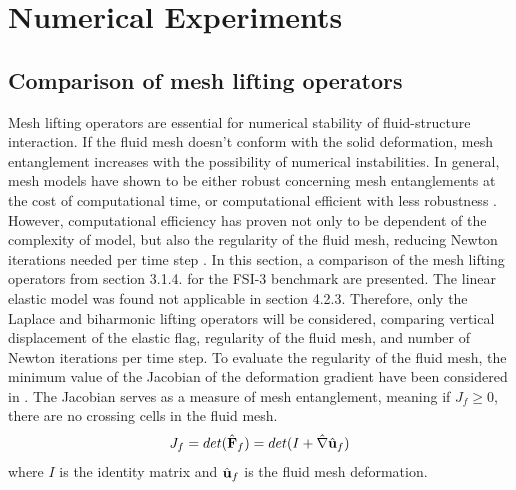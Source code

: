  \chapter{Numerical Experiments}
\section{Comparison of mesh lifting operators}
Mesh lifting operators are essential for numerical stability of fluid-structure interaction. If the fluid mesh doesn't conform with the solid deformation, mesh entanglement increases with the possibility of numerical instabilities. In general, mesh models have shown to be either robust concerning mesh entanglements at the cost of computational time, or computational efficient with less robustness \cite{MM2016}. However, computational efficiency has proven not only to be dependent of the complexity of model, but also the regularity of the fluid mesh, reducing Newton iterations needed per time step \cite{Wickb}. In this section, a comparison of the mesh lifting operators from section 3.1.4. for the FSI-3 benchmark are presented. The linear elastic model was found not applicable in section 4.2.3. Therefore, only the Laplace and biharmonic lifting operators will be considered, comparing vertical displacement of the elastic flag, regularity of the fluid mesh, and number of Newton iterations per time step. To evaluate the regularity of the fluid mesh, the minimum value of the Jacobian of the deformation gradient have been considered in \cite{Wickb}. The Jacobian serves as a measure of mesh entanglement, meaning if $J_f \geq 0$, there are no crossing cells in the fluid mesh. 
\begin{align*}
{J}_f = det(\hat{\mathbf{F}}_f) =  det(I + \hat{\nabla} \hat{\mathbf{u}}_f)
\end{align*}
where $I$ is the identity matrix and $ \hat{\mathbf{u}}_f$ is the fluid mesh deformation. 
\newpage
